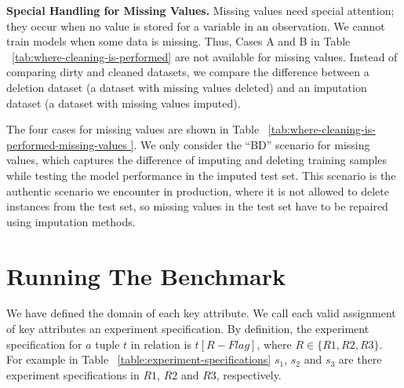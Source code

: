 \textbf{Special Handling for Missing Values.} 
Missing values need special attention; they occur when no value is stored for a variable in an observation. We cannot train models when some data is missing. 
Thus, Cases A and B in Table ~\ref{tab:where-cleaning-is-performed} are not available for missing values. Instead of comparing dirty and cleaned datasets, we compare the difference between a deletion dataset (a dataset with missing values deleted) and an imputation dataset (a dataset with missing values imputed). 

The four cases for missing values are shown in Table ~\ref{tab:where-cleaning-is-performed-missing-values }. 
We only consider the “BD” scenario for missing values, which captures the difference of imputing and deleting training samples while testing the model performance in the imputed test set. 
This scenario is the authentic scenario we encounter in production, where it is not allowed to delete instances from the test set, so missing values in the test set have to be repaired using
imputation methods.

\section{Running The Benchmark}

We have defined the domain of each key attribute. We call each
valid assignment of key attributes an experiment specification. By
definition, the experiment specification for $a$ tuple $t$ in relation is $t[R - Flag]$, where $R \in \{R1, R2, R3\} $. For example in Table ~\ref{table:experiment-specifications} $s_{1}$, $s_{2}$ and $s_{3}$ are there experiment specifications in $R1$, $R2$ and $R3$, respectively.

